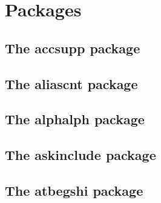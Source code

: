 \documentclass[a4paper,12pt]{article}
\makeatletter
\providecommand*{\plainTeX}{\mbox{plain-\TeX}}
\providecommand*{\eTeX}{$\csname m@th\endcsname\varepsilon$-\TeX}
\newcommand*{\xpackage}[1]{\textsf{#1}}
\newcommand*{\cs}[1]{\texttt{\textbackslash#1}}
\newcommand*{\tocinclude}[1]{%
  \setcounter{tocdepth}{3}%
  \begingroup
    \makeatletter
    \def\@prj{#1}%
    \let\contentsline\foreign@contentsline
  \endgroup
}
\def\foreign@contentsline#1#2#3#4{%
  \ifx\\#4\\%
    \csname l@#1\endcsname{#2}{#3}%
  \else
    \ifHy@linktocpage
      \csname l@#1\endcsname{{#2}}{%
        \hyper@linkfile{#3}{\@prj.pdf}{#4}%
      }%
    \else
      \csname l@#1\endcsname{%
        \hyper@linkfile{#2}{\@prj.pdf}{#4}%
      }{#3}%
    \fi
  \fi
}%
\newcommand*{\pkgsectformat}[1]{%
  \texorpdfstring{%
    \textcolor{link}{The} %
    \xpackage{#1} %
    \textcolor{link}{package}%
  }{#1}%
}
\makeatother
\begin{document}
\section{Packages}
\hypersetup{bookmarksnumbered=false}

\subsection{\pkgsectformat{accsupp}}
\label{accsupp}
\begin{abstract}
Since PDF 1.5 portions of a page can be marked for better
accessibility support.
For example, replacement texts or expansions of abbreviations can be
provided. Package \xpackage{accsupp} starts with providing a minimal
low-level interface for programmers. Status is experimental.
\end{abstract}
\tocinclude{accsupp}

\newpage
\subsection{\pkgsectformat{aliascnt}}
\label{aliascnt}
\begin{abstract}
Package \xpackage{aliascnt} introduces \emph{alias counters} that
share the same counter register and clear list.
\end{abstract}
\tocinclude{aliascnt}

\newpage
\subsection{\pkgsectformat{alphalph}}
\label{alphalph}
\begin{abstract}
The package provides methods to represent numbers with a limited
set of symbols. Both  and  are supported.
\end{abstract}
\tocinclude{alphalph}

\newpage
\subsection{\pkgsectformat{askinclude}}
\label{askinclude}
\begin{abstract}
This package replaces \cs{includeonly} by an interactive user
interface.
\end{abstract}
\tocinclude{askinclude}

\newpage
\subsection{\pkgsectformat{atbegshi}}
\label{atbegshi}
\begin{abstract}
This package is a modern reimplementation of package \xpackage{everyshi}
without the burden of compatibility. It makes use of \eTeX's if available.
Both \LaTeX\ and \plainTeX\ are supported.
\end{abstract}
\tocinclude{atbegshi}
\end{document}
